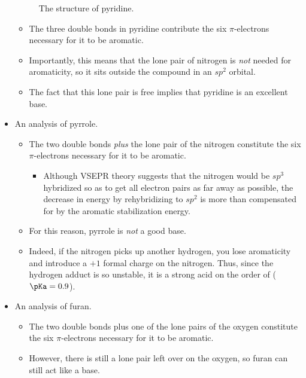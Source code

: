\documentclass[../notes.tex]{subfiles}
\begin{document}
\begin{itemize}
\begin{figure}[h!]
        \caption{The structure of pyridine.}
        \label{fig:pyridineStructure}
    \end{figure}
    \begin{itemize}
        \item The three double bonds in pyridine contribute the six $\pi$-electrons necessary for it to be aromatic.
        \item Importantly, this means that the lone pair of nitrogen is \emph{not} needed for aromaticity, so it sits outside the compound in an $sp^2$ orbital.
        \item The fact that this lone pair is free implies that pyridine is an excellent base.
    \end{itemize}
    \item An analysis of pyrrole.
    \begin{itemize}
        \item The two double bonds \emph{plus} the lone pair of the nitrogen constitute the six $\pi$-electrons necessary for it to be aromatic.
        \begin{itemize}
            \item Although VSEPR theory suggests that the nitrogen would be $sp^3$ hybridized so as to get all electron pairs as far away as possible, the decrease in energy by rehybridizing to $sp^2$ is more than compensated for by the aromatic stabilization energy.
        \end{itemize}
        \item For this reason, pyrrole is \emph{not} a good base.
        \item Indeed, if the nitrogen picks up another hydrogen, you lose aromaticity and introduce a $+1$ formal charge on the nitrogen. Thus, since the hydrogen adduct is so unstable, it is a strong acid on the order of  ($\pKa=0.9$).
    \end{itemize}
    \item An analysis of furan.
    \begin{itemize}
        \item The two double bonds plus one of the lone pairs of the oxygen constitute the six $\pi$-electrons necessary for it to be aromatic.
        \item However, there is still a lone pair left over on the oxygen, so furan can still act like a base.

\end{itemize}
\end{itemize}
\end{document}
